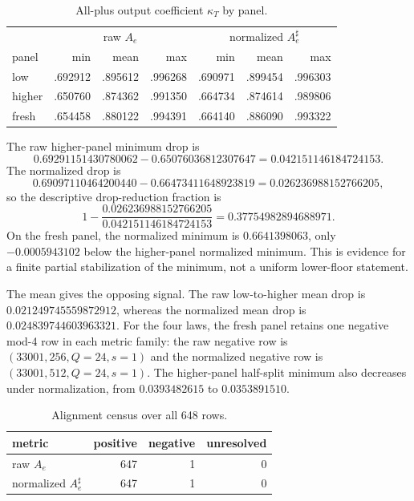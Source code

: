 \documentclass[10pt]{article}
\begin{document}
\begin{table}[h]
\centering\small
\caption{All-plus output coefficient $\kappa_T$ by panel.}
\label{tab:floor}
\begin{tabular}{lrrrrrr}
\toprule
 & \multicolumn{3}{c}{raw $A_e$} & \multicolumn{3}{c}{normalized $A_e^\sharp$}\\
panel & min & mean & max & min & mean & max\\
\midrule
low & .692912 & .895612 & .996268 & .690971 & .899454 & .996303\\
higher & .650760 & .874362 & .991350 & .664734 & .874614 & .989806\\
fresh & .654458 & .880122 & .994391 & .664140 & .886090 & .993322\\
\bottomrule
\end{tabular}
\end{table}

The raw higher-panel minimum drop is
\[
  0.69291151430780062-0.65076036812307647
  =0.042151146184724153.
\]
The normalized drop is
\[
  0.69097110464200440-0.66473411648923819
  =0.026236988152766205,
\]
so the descriptive drop-reduction fraction is
\[
  1-\frac{0.026236988152766205}{0.042151146184724153}
  =0.37754982894688971.
\]
On the fresh panel, the normalized minimum is $0.6641398063$, only
$-0.0005943102$ below the higher-panel normalized minimum.  This is evidence
for a finite partial stabilization of the minimum, not a uniform lower-floor
statement.

The mean gives the opposing signal.  The raw low-to-higher mean drop is
$0.021249745559872912$, whereas the normalized mean drop is
$0.024839744603963321$.  For the four laws, the fresh panel retains one
negative mod-4 row in each metric family: the raw negative row is
$(33001,256,Q=24,s=1)$ and the normalized negative row is
$(33001,512,Q=24,s=1)$.  The higher-panel half-split minimum also decreases
under normalization, from $0.0393482615$ to $0.0353891510$.

\begin{table}[h]
\centering\small
\caption{Alignment census over all 648 rows.}
\label{tab:census}
\begin{tabular}{lrrr}
\toprule
metric & positive & negative & unresolved\\
\midrule
raw $A_e$ & 647 & 1 & 0\\
normalized $A_e^\sharp$ & 647 & 1 & 0\\
\bottomrule
\end{tabular}
\end{table}
\end{document}
